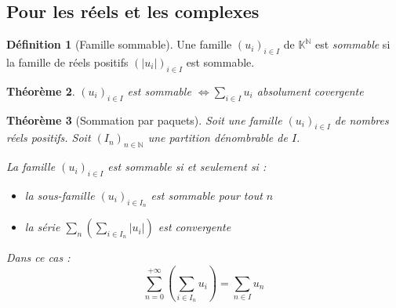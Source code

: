 \documentclass[11pt,a4paper]{report}
\newtheorem{theorem}{Théorème}[chapter]
\newtheorem{itheorem}[theorem]{Théorème}
\theoremstyle{definition}
\newtheorem{dfn}[theorem]{Définition}
\begin{document}
\subsection{Pour les réels et les complexes} %
\label{sub:famille_sommable_complexe_reel}
\begin{dfn}[Famille sommable]
     Une famille $(u_i)_{i\in I}$ de $\mathbb{K}^\mathbb{N}$ est \emph{sommable} si la famille de réels positifs $(|u_i|)_{i\in I}$ est sommable.
\end{dfn}
\begin{theorem}
     $(u_i)_{i\in I}$ est \emph{sommable} $\Leftrightarrow \sum_{i\in I} u_i$ \emph{ absolument covergente}
\end{theorem}
\begin{itheorem}[Sommation par paquets]
     Soit une famille $(u_i)_{i\in I}$ de nombres réels positifs.\newline
     Soit $(I_n)_{n\in\mathbb{N}}$ une partition \emph{dénombrable} de $I$.\par
     La famille $(u_i)_{i\in I}$ est sommable \emph{si et seulement si} :
     \begin{itemize}
         \item la sous-famille $(u_i)_{i\in I_n}$ est sommable pour tout $n$
         \item la série $\sum_n \left( \sum_{i\in I_n} |u_i | \right)$ est convergente
     \end{itemize}
     Dans ce cas : 
     \begin{equation}
     \sum_{n=0}^{+\infty} \left( \sum_{i\in I_n} u_i \right) = \sum_{n\in I} u_n
     \end{equation}
\end{itheorem}
\end{document}
